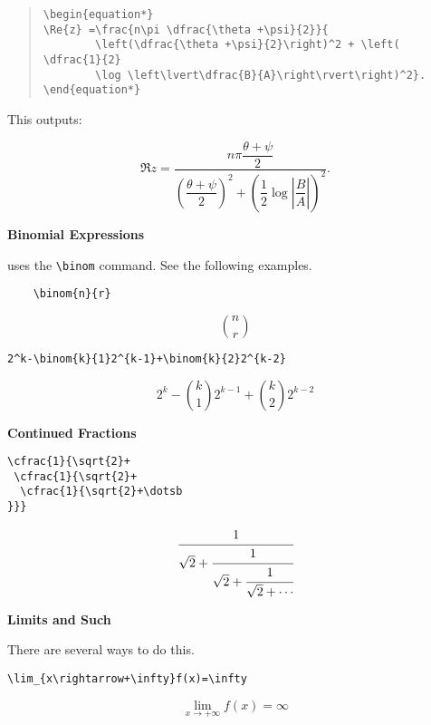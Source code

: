 \documentclass[letterpaper,twoside,10pt]{article}
\begin{document}
\begin{quote}
 \small{\begin{verbatim}
\begin{equation*}
\Re{z} =\frac{n\pi \dfrac{\theta +\psi}{2}}{
        \left(\dfrac{\theta +\psi}{2}\right)^2 + \left( \dfrac{1}{2}
        \log \left\lvert\dfrac{B}{A}\right\rvert\right)^2}.
\end{equation*}
        \end{verbatim}
}
\end{quote}

This outputs:

\begin{equation*}
\Re{z} =\frac{n\pi \dfrac{\theta +\psi}{2}}{
        \left(\dfrac{\theta +\psi}{2}\right)^2 + \left( \dfrac{1}{2}
        \log \left\lvert\dfrac{B}{A}\right\rvert\right)^2}.
\end{equation*}


\bigbreak\textbf{Binomial Expressions}

{\LaTeXe} uses the \verb!\binom! command. See the following examples.

\begin{multicols}{2}
\small{\begin{verbatim}
	\binom{n}{r}
\end{verbatim}
}
\[
	\binom{n}{r}
\]

\end{multicols}



\begin{multicols}{2}
\small{\begin{verbatim}
2^k-\binom{k}{1}2^{k-1}+\binom{k}{2}2^{k-2}
\end{verbatim}}
\[
 2^k-\binom{k}{1}2^{k-1}+\binom{k}{2}2^{k-2}
\]
\end{multicols}

\newpage
\textbf{Continued Fractions}

\begin{multicols}{2}
\small{\begin{verbatim}
\cfrac{1}{\sqrt{2}+
 \cfrac{1}{\sqrt{2}+
  \cfrac{1}{\sqrt{2}+\dotsb
}}}
\end{verbatim}}
\[
\cfrac{1}{\sqrt{2}+
 \cfrac{1}{\sqrt{2}+
  \cfrac{1}{\sqrt{2}+\dotsb
}}}
\]
\end{multicols}

\bigbreak\textbf{Limits and Such}

There are several ways to do this.

\begin{multicols}{2}
\small{\begin{verbatim}
\lim_{x\rightarrow+\infty}f(x)=\infty
\end{verbatim}}
\[
\lim_{x\rightarrow+\infty}f(x)=\infty
\]
\end{multicols}
\end{document}
